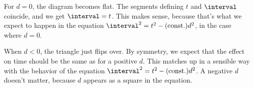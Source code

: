 For $d=0$, the diagram becomes flat. The segments defining $t$ and $\interval$ coincide,
and we get $\interval=t$. This makes sense, because that's what we expect to happen in
the equation $\interval^2=t^2-(\text{const.})d^2$, in the case where $d=0$.

When $d<0$, the triangle just flips over. By symmetry, we expect that the effect on
time should be the same as for a positive $d$. This matches up in a sensible way
with the behavior of the equation $\interval^2=t^2-(\text{const.})d^2$. A negative
$d$ doesn't matter, because $d$ appears as a square in the equation.
